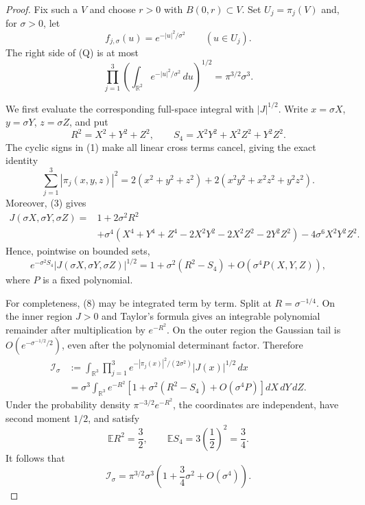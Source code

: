 \documentclass[11pt]{article}
\newcommand{\R}{\mathbb R}
\newcommand{\I}{\mathcal I}
\begin{document}
\begin{proof}
Fix such a $V$ and choose $r>0$ with $B(0,r)\subset V$.  Set
$U_j=\pi_j(V)$ and, for $\sigma>0$, let
\begin{equation}
 f_{j,\sigma}(u)=e^{-|u|^2/\sigma^2}\qquad(u\in U_j).
\end{equation}
The right side of \textup{(Q)} is at most
\begin{equation}
 \prod_{j=1}^3\left(\int_{\R^2}e^{-|u|^2/\sigma^2}\,du\right)^{1/2}
 =\pi^{3/2}\sigma^3.
\end{equation}

We first evaluate the corresponding full-space integral with $|J|^{1/2}$.
Write $x=\sigma X$, $y=\sigma Y$, $z=\sigma Z$, and put
\[
 R^2=X^2+Y^2+Z^2,
 \qquad S_4=X^2Y^2+X^2Z^2+Y^2Z^2.
\]
The cyclic signs in \textup{(1)} make all linear cross terms cancel, giving
the exact identity
\begin{equation}
 \sum_{j=1}^3|\pi_j(x,y,z)|^2
 =2(x^2+y^2+z^2)+2(x^2y^2+x^2z^2+y^2z^2).
\end{equation}
Moreover, \textup{(3)} gives
\begin{equation}
\begin{aligned}
J(\sigma X,\sigma Y,\sigma Z)
={}&1+2\sigma^2R^2\\
&+\sigma^4(X^4+Y^4+Z^4-2X^2Y^2-2X^2Z^2-2Y^2Z^2)
-4\sigma^6X^2Y^2Z^2.
\end{aligned}
\end{equation}
Hence, pointwise on bounded sets,
\begin{equation}
 e^{-\sigma^2S_4}|J(\sigma X,\sigma Y,\sigma Z)|^{1/2}
 =1+\sigma^2(R^2-S_4)+O(\sigma^4P(X,Y,Z)),
\end{equation}
where $P$ is a fixed polynomial.

For completeness, \textup{(8)} may be integrated term by term.  Split at
$R=\sigma^{-1/4}$.  On the inner region $J>0$ and Taylor's formula gives an
integrable polynomial remainder after multiplication by $e^{-R^2}$.  On the
outer region the Gaussian tail is $O(e^{-\sigma^{-1/2}/2})$, even after the
polynomial determinant factor.  Therefore
\begin{equation}
\begin{aligned}
\I_\sigma
&:=\int_{\R^3}\prod_{j=1}^3
 e^{-|\pi_j(x)|^2/(2\sigma^2)}|J(x)|^{1/2}\,dx\\
&=\sigma^3\int_{\R^3}e^{-R^2}
 \left[1+\sigma^2(R^2-S_4)+O(\sigma^4P)\right]dX\,dY\,dZ.
\end{aligned}
\end{equation}
Under the probability density $\pi^{-3/2}e^{-R^2}$, the coordinates are
independent, have second moment $1/2$, and satisfy
\begin{equation}
 \mathbb E R^2=\frac32,
 \qquad
 \mathbb E S_4=3\left(\frac12\right)^2=\frac34.
\end{equation}
It follows that
\begin{equation}
 \I_\sigma=\pi^{3/2}\sigma^3
 \left(1+\frac34\sigma^2+O(\sigma^4)\right).
\end{equation}


\end{proof}
\end{document}
